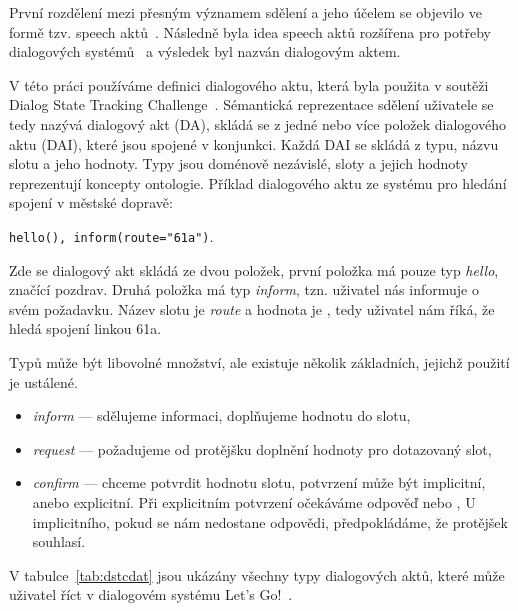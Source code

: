 První rozdělení mezi přesným významem sdělení a jeho účelem se objevilo ve formě tzv. speech aktů~\cite{austin1975things}.
Následně byla idea speech aktů rozšířena pro potřeby dialogových systémů~\cite{traum1999speech} a výsledek byl nazván dialogovým aktem.

V této práci používáme definici dialogového aktu, která byla použita v soutěži Dialog State Tracking Challenge~\cite{williamsdialog}.
Sémantická reprezentace sdělení uživatele se tedy nazývá dialogový akt (DA), skládá se z jedné nebo více položek dialogového aktu (DAI), které jsou spojené v konjunkci.
Každá DAI se skládá z typu, názvu slotu a jeho hodnoty. Typy jsou doménově nezávislé, sloty a jejich hodnoty reprezentují koncepty ontologie.
Příklad dialogového aktu ze systému pro hledání spojení v městské dopravě:

\begin{center}
{\tt hello(), inform(route="61a")}.
\end{center}

Zde se dialogový akt skládá ze dvou položek, první položka má pouze typ {\em hello}, značící pozdrav.
Druhá položka má typ {\em inform}, tzn. uživatel nás informuje o svém požadavku.
Název slotu je {\em route} a hodnota je , tedy uživatel nám říká, že hledá spojení linkou 61a.

Typů může být libovolné množství, ale existuje několik základních, jejichž použití je ustálené.
\begin{itemize}
\item {\em inform} --- sdělujeme informaci, doplňujeme hodnotu do slotu,
\item {\em request} --- požadujeme od protějšku doplnění hodnoty pro dotazovaný slot,
\item {\em confirm} --- chceme potvrdit hodnotu slotu, potvrzení může být implicitní, anebo explicitní.
	Při explicitním potvrzení očekáváme odpověď  nebo ,
	U implicitního, pokud se nám nedostane odpovědi, předpokládáme, že protějšek souhlasí.
\end{itemize}

V tabulce~\ref{tab:dstcdat} jsou ukázány všechny typy dialogových aktů, které může uživatel říct v dialogovém systému Let's Go!~\cite{williamsdialog}.

